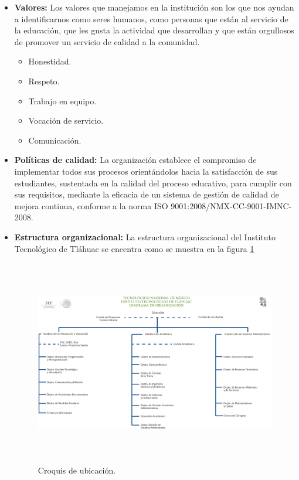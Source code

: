 \begin{itemize}
    \item \textbf{Valores:}  Los valores que manejamos en la instituci\'on son los que nos ayudan a identificarnos como seres humanos, como personas que est\'an al servicio de la educaci\'on, que les gusta la actividad que desarrollan y que est\'an orgullosos de promover un servicio de calidad a la comunidad.
    \begin{itemize}
        \item Honestidad.
        \item Respeto.
        \item Trabajo en equipo.
        \item Vocaci\'on de servicio.
        \item Comunicaci\'on.
    \end{itemize}
    \item \textbf{Pol\'iticas de calidad:} La organizaci\'on establece el compromiso de implementar todos sus procesos orient\'andolos hacia la satisfacci\'on de sus estudiantes, sustentada en la calidad del proceso educativo, para cumplir con sus requisitos, mediante la eficacia de un sistema de gesti\'on de calidad de mejora continua, conforme a la norma ISO 9001:2008/NMX-CC-9001-IMNC-2008.
    
    \item \textbf{Estructura organizacional:} La estructura organizacional del Instituto Tecnol\'ogico de Tl\'ahuac se encentra como se muestra en la figura \ref{fig_organigrama}

    \begin{figure}[htb]
        \centering
        \includegraphics[width=14cm, height=9cm]{figuras/organigrama}
        \caption{Croquis de ubicaci\'on.}
        \label{fig_organigrama}
    \end{figure}
\end{itemize}

